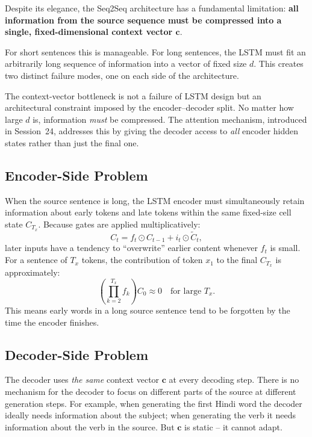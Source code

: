 \documentclass[12pt,a4paper]{article}
\begin{document}
Despite its elegance, the Seq2Seq architecture has a fundamental limitation: \textbf{all
information from the source sequence must be compressed into a single, fixed-dimensional
context vector $\mathbf{c}$}.

For short sentences this is manageable. For long sentences, the LSTM must fit an arbitrarily
long sequence of information into a vector of fixed size $d$. This creates two distinct failure
modes, one on each side of the architecture.

\begin{keyinsight}
  The context-vector bottleneck is not a failure of LSTM design but an architectural
  constraint imposed by the encoder--decoder split. No matter how large $d$ is, information
  \emph{must} be compressed. The attention mechanism, introduced in Session~24, addresses this
  by giving the decoder access to \emph{all} encoder hidden states rather than just the final
  one.
\end{keyinsight}

\subsection{Encoder-Side Problem}

When the source sentence is long, the LSTM encoder must simultaneously retain information about
early tokens and late tokens within the same fixed-size cell state $C_{T_x}$. Because gates
are applied multiplicatively:
\begin{equation}
  C_t = f_t \odot C_{t-1} + i_t \odot \tilde{C}_t,
  \label{eq:cell_overwrite}
\end{equation}
later inputs have a tendency to ``overwrite'' earlier content whenever $f_t$ is small. For a
sentence of $T_x$ tokens, the contribution of token $x_1$ to the final $C_{T_x}$ is
approximately:
\begin{equation}
  \left(\prod_{k=2}^{T_x} f_k\right) C_0 \approx 0 \quad \text{for large } T_x.
  \label{eq:forget_product}
\end{equation}
This means early words in a long source sentence tend to be forgotten by the time the encoder
finishes.

\subsection{Decoder-Side Problem}

The decoder uses \emph{the same} context vector $\mathbf{c}$ at every decoding step. There is
no mechanism for the decoder to focus on different parts of the source at different generation
steps. For example, when generating the first Hindi word the decoder ideally needs information
about the subject; when generating the verb it needs information about the verb in the source.
But $\mathbf{c}$ is static -- it cannot adapt.
\end{document}
